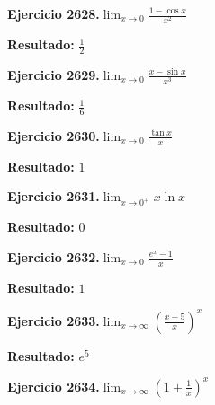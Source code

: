 \documentclass[10pt,a4paper]{article}
\begin{document}
\newpage
\begin{ejbox}
\textbf{Ejercicio 2628.}\quad $\lim_{x\to 0} \frac{1-\cos x}{x^2}$
\end{ejbox}

\begin{solbox}
\textbf{Resultado:} \(\displaystyle \frac{1}{2}\)
\end{solbox}

\begin{ejbox}
\textbf{Ejercicio 2629.}\quad $\lim_{x\to 0} \frac{x-\sin x}{x^3}$
\end{ejbox}

\begin{solbox}
\textbf{Resultado:} \(\displaystyle \frac{1}{6}\)
\end{solbox}

\begin{ejbox}
\textbf{Ejercicio 2630.}\quad $\lim_{x\to 0} \frac{\tan x}{x}$
\end{ejbox}

\begin{solbox}
\textbf{Resultado:} \(\displaystyle 1\)
\end{solbox}

\newpage
\begin{ejbox}
\textbf{Ejercicio 2631.}\quad $\lim_{x\to 0^+} x\ln x$
\end{ejbox}

\begin{solbox}
\textbf{Resultado:} \(\displaystyle 0\)
\end{solbox}

\begin{ejbox}
\textbf{Ejercicio 2632.}\quad $\lim_{x\to 0} \frac{e^x-1}{x}$
\end{ejbox}

\begin{solbox}
\textbf{Resultado:} \(\displaystyle 1\)
\end{solbox}

\begin{ejbox}
\textbf{Ejercicio 2633.}\quad $\lim_{x\to \infty} \left(\frac{x+5}{x}\right)^{x}$
\end{ejbox}

\begin{solbox}
\textbf{Resultado:} \(\displaystyle e^{5}\)
\end{solbox}

\newpage
\begin{ejbox}
\textbf{Ejercicio 2634.}\quad $\lim_{x\to \infty} \left(1+\frac{1}{x}\right)^x$
\end{ejbox}
\end{document}

